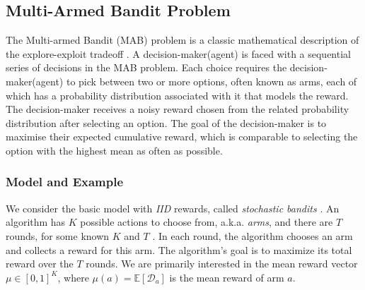 \subsection{Multi-Armed Bandit Problem}
\hspace*{0.7cm}The Multi-armed Bandit (MAB) problem is a classic mathematical description of the explore-exploit tradeoff \cite{Robbins:1952}. 
A decision-maker(agent) is faced with a sequential series of decisions in the MAB problem. Each choice requires the decision-maker(agent) to pick between two or more options, often known as arms, each of which has a probability distribution associated with it that models the reward. 
The decision-maker receives a noisy reward chosen from the related probability distribution after selecting an option. The goal of the decision-maker is to maximise their expected cumulative reward, which is comparable to selecting the option with the highest mean as often as possible.

\subsubsection{Model and Example}
We consider\textcolor{white}{"}the basic model with \textit{IID} rewards, called \textit{stochastic  bandits} \cite{mab-intro}. An algorithm has $K$ possible actions to choose from, a.k.a. \textit{arms}, and there are $T$ rounds, for some known $K$ and $T$ . In each round, the algorithm chooses an arm and collects a reward for this arm. The algorithm’s goal is to maximize its total reward over the $T$ rounds. We are primarily interested in the mean reward vector $\mu \in [0, 1]^K$, where $\mu(a) = \mathbb{E}[\mathcal{D}_a]$ is the mean reward of arm $a$.\textcolor{white}{"}

